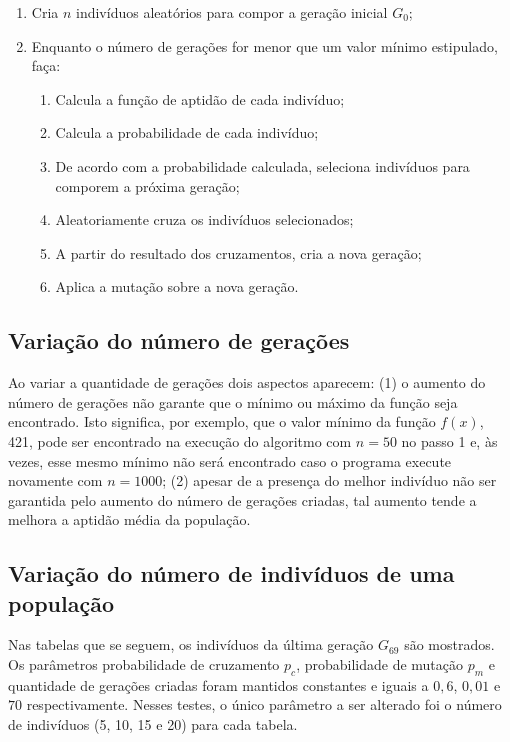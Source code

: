 \documentclass[11pt]{article}
\begin{document}
\begin{enumerate}
\item Cria $n$ indivíduos aleatórios para compor a geração inicial $G_0$;

\item Enquanto o número de gerações for menor que um valor mínimo estipulado, faça:

\begin{enumerate}
\item Calcula a função de aptidão de cada indivíduo;

\item Calcula a probabilidade de cada indivíduo;

\item De acordo com a probabilidade calculada, seleciona indivíduos para comporem a próxima geração;

\item Aleatoriamente cruza os indivíduos selecionados;

\item A partir do resultado dos cruzamentos, cria a nova geração;

\item Aplica a mutação sobre a nova geração.
\end{enumerate}
\end{enumerate}

\subsection{Variação do número de gerações}

Ao variar a quantidade de gerações dois aspectos aparecem: (1) o aumento do número de gerações não garante que o mínimo ou máximo da função seja encontrado. Isto significa, por exemplo, que o valor mínimo da função $f(x)$, 421, pode ser encontrado na execução do algoritmo com $n = 50$ no passo 1 e, às vezes, esse mesmo mínimo não será encontrado caso o programa execute novamente com $n = 1000$; (2) apesar de a presença do melhor indivíduo não ser garantida pelo aumento do número de gerações criadas, tal aumento tende a melhora a aptidão média da população.

\subsection{Variação do número de indivíduos de uma população}

Nas tabelas que se seguem, os indivíduos da última geração $G_{69}$ são mostrados. Os parâmetros probabilidade de cruzamento $p_c$, probabilidade de mutação $p_m$ e quantidade de gerações criadas foram mantidos constantes e iguais a $0,6$, $0,01$ e $70$ respectivamente. Nesses testes, o único parâmetro a ser alterado foi o número de indivíduos (5, 10, 15 e 20) para cada tabela.
\end{document}
